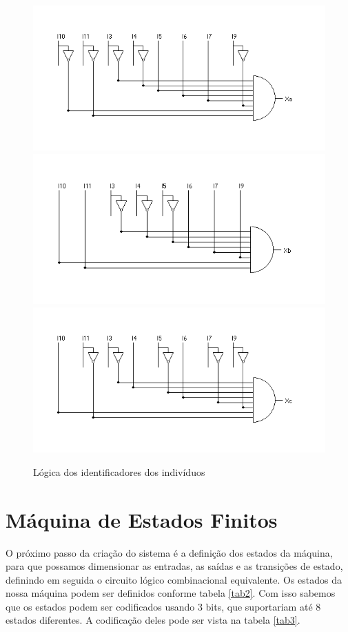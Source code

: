 \documentclass[12pt,a4paper]{article}
\begin{document}
\begin{figure}[!h]
\begin{center}
\includegraphics[width=.7\textwidth]{xa.png}
\includegraphics[width=.7\textwidth]{xb.png}
\includegraphics[width=.7\textwidth]{xc.png}
\end{center}
\caption{Lógica dos identificadores dos indivíduos}
\label{fig1}
\end{figure}

\section{Máquina de Estados Finitos}

O próximo passo da criação do sistema é a definição dos estados da máquina, para que possamos dimensionar as entradas, as saídas e as transições de estado, definindo em seguida o circuito lógico combinacional equivalente. Os estados da nossa máquina podem ser definidos conforme tabela \ref{tab2}. Com isso sabemos que os estados podem ser codificados usando 3 bits, que suportariam até 8 estados diferentes. A codificação deles pode ser vista na tabela \ref{tab3}.
\end{document}
